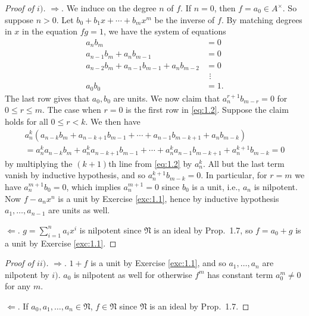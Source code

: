\documentclass[12pt,letterpaper]{article}
\theoremstyle{definition}
\theoremstyle{remark}
\numberwithin{figure}{problem}
\numberwithin{equation}{section}
\begin{document}
\begin{proof}[Proof of $i)$]
  $\Rightarrow$. We induce on the degree $n$ of $f$.
  If $n=0$, then $f = a_0 \in A^\times$.
  So suppose $n > 0$.
  Let $b_0 + b_1x + \cdots + b_mx^m$ be the inverse of $f$.
  By matching degrees in $x$ in the equation $fg = 1$, we have the system of
  equations
  \begin{equation}\label{eq:1.2}
    \begin{aligned}
      a_nb_m &= 0\\
      a_{n-1}b_m + a_nb_{m-1} &= 0\\
      a_{n-2}b_m + a_{n-1}b_{m-1} + a_nb_{m-2} &= 0\\
      &\ \,\vdots\\
      a_0b_0 &= 1.
    \end{aligned}
  \end{equation}
  The last row gives that $a_0,b_0$ are units.
  We now claim that $a_n^{r+1}b_{m-r} = 0$ for $0 \le r \le m$.
  The case when $r=0$ is the first row in \eqref{eq:1.2}.
  Suppose the claim holds for all $0 \le r < k$.
  We then have
  \begin{multline*}
    a_n^k(a_{n-k}b_m + a_{n-k+1}b_{m-1} + \cdots + a_{n-1}b_{m-k+1} + a_nb_{m-k})\\
    = a_n^ka_{n-k}b_m + a_n^ka_{n-k+1}b_{m-1} + \cdots + a_n^ka_{n-1}b_{m-k+1} + a_n^{k+1}b_{m-k} = 0
  \end{multline*}
  by multiplying the $(k+1)$th line from \eqref{eq:1.2} by $a_n^k$.
  All but the last term vanish by inductive hypothesis, and so
  $a_n^{k+1}b_{m-k} = 0$.
  In particular, for $r=m$ we have $a_n^{m+1}b_0 = 0$, which implies
  $a_n^{m+1} = 0$ since $b_0$ is a unit, i.e., $a_n$ is nilpotent. 
  Now $f - a_nx^n$ is a unit by Exercise \ref{exc:1.1}, hence by inductive
  hypothesis $a_1,\ldots,a_{n-1}$ are units as well.
  \par $\Leftarrow$. $g = \sum_{i=1}^n a_ix^i$ is nilpotent since $\mathfrak{N}$
  is an ideal by Prop.~1.7, so $f = a_0 + g$ is a unit by Exercise \ref{exc:1.1}.
\end{proof}
\begin{proof}[Proof of $ii)$]
  $\Rightarrow$. $1 + f$ is a unit by Exercise \ref{exc:1.1}, and so
  $a_1,\ldots,a_n$ are nilpotent by $i)$.
  $a_0$ is nilpotent as well for otherwise $f^m$ has constant term $a_0^m \ne 0$
  for any $m$.
  \par $\Leftarrow$. If $a_0,a_1,\ldots,a_n \in \mathfrak{N}$, $f \in \mathfrak{N}$
  since $\mathfrak{N}$ is an ideal by Prop.~1.7.
\end{proof}
\end{document}
